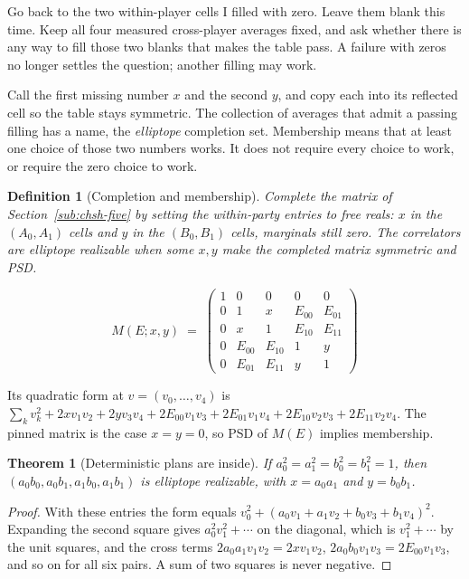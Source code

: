 \documentclass[11pt,twoside]{article}
\theoremstyle{thielethm}
\newtheorem{theorem}{Theorem}[section]
\theoremstyle{thieledef}
\newtheorem{definition}{Definition}[section]
\theoremstyle{thieledef}
\theoremstyle{thieledef}
\theoremstyle{thielethm}
\theoremstyle{thieleobs}
\theoremstyle{thielethm}
\begin{document}
Go back to the two within-player cells I filled with zero. Leave them blank
this time. Keep all four measured cross-player averages fixed, and ask whether
there is any way to fill those two blanks that makes the table pass. A failure
with zeros no longer settles the question; another filling may work.

Call the first missing number $x$ and the second $y$, and copy each into its
reflected cell so the table stays symmetric. The collection of averages that
admit a passing filling has a name, the \emph{elliptope} completion set.
Membership means that at least one choice of those two numbers works. It
does not require every choice to work, or require the zero choice to work.

\begin{definition}[Completion and membership]
Complete the matrix of Section~\ref{sub:chsh-five} by setting the
within-party entries to free reals: $x$ in the $(A_0, A_1)$ cells and $y$ in the
$(B_0, B_1)$ cells, marginals still zero. The correlators are elliptope realizable
 when some $x, y$ make the completed matrix symmetric and PSD.
\end{definition}

\[
M(E; x, y) \;=\;
\begin{pmatrix}
1 & 0 & 0 & 0 & 0 \\
0 & 1 & x & E_{00} & E_{01} \\
0 & x & 1 & E_{10} & E_{11} \\
0 & E_{00} & E_{10} & 1 & y \\
0 & E_{01} & E_{11} & y & 1
\end{pmatrix}
\]

Its quadratic form at $v = (v_0, \ldots, v_4)$ is
$\sum_k v_k^2 + 2x v_1 v_2 + 2y v_3 v_4 + 2E_{00} v_1 v_3 + 2E_{01} v_1 v_4 + 2E_{10} v_2 v_3
+ 2E_{11} v_2 v_4$. The pinned matrix is the case $x = y = 0$,
so PSD of $M(E)$ implies membership.

\begin{theorem}[Deterministic plans are inside]\label{thm:chsh-ell-det}
If $a_0^2 = a_1^2 = b_0^2 = b_1^2 = 1$, then
$(a_0 b_0, a_0 b_1, a_1 b_0, a_1 b_1)$ is elliptope realizable, with $x = a_0 a_1$ and
$y = b_0 b_1$.
\end{theorem}

\begin{proof}
With these entries the form equals
$v_0^2 + (a_0 v_1 + a_1 v_2 + b_0 v_3 + b_1 v_4)^2$. Expanding the second square gives
$a_0^2 v_1^2 + \cdots$ on the diagonal, which is $v_1^2 + \cdots$ by the unit squares, and the
cross terms $2 a_0 a_1 v_1 v_2 = 2x v_1 v_2$, $2 a_0 b_0 v_1 v_3 = 2E_{00} v_1 v_3$, and so on
for all six pairs. A sum of two squares is never negative.
\end{proof}
\end{document}
